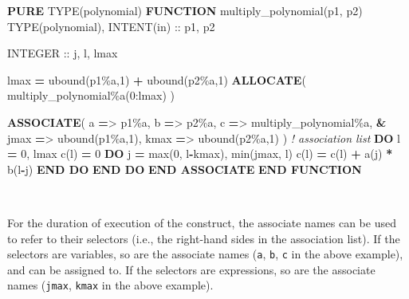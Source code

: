\documentclass[
]{scrartcl}
\newenvironment{Shaded}{}{}
\newcommand{\BuiltInTok}[1]{\textcolor[rgb]{0.00,0.50,0.00}{#1}}
\newcommand{\CommentTok}[1]{\textcolor[rgb]{0.38,0.63,0.69}{\textit{#1}}}
\newcommand{\DataTypeTok}[1]{\textcolor[rgb]{0.56,0.13,0.00}{#1}}
\newcommand{\DecValTok}[1]{\textcolor[rgb]{0.25,0.63,0.44}{#1}}
\newcommand{\FunctionTok}[1]{\textcolor[rgb]{0.02,0.16,0.49}{#1}}
\newcommand{\KeywordTok}[1]{\textcolor[rgb]{0.00,0.44,0.13}{\textbf{#1}}}
\newcommand{\NormalTok}[1]{#1}
\newcommand{\OperatorTok}[1]{\textcolor[rgb]{0.40,0.40,0.40}{#1}}
\begin{document}
\begin{Shaded}
\begin{Highlighting}[]
\KeywordTok{PURE} \DataTypeTok{TYPE(polynomial)} \KeywordTok{FUNCTION}\NormalTok{ multiply\_polynomial(p1, p2)}
   \DataTypeTok{TYPE(polynomial)}\NormalTok{, }\DataTypeTok{INTENT(in)} \DataTypeTok{::}\NormalTok{ p1, p2}

   \DataTypeTok{INTEGER} \DataTypeTok{::}\NormalTok{ j, l, lmax}

\NormalTok{   lmax }\KeywordTok{=} \FunctionTok{ubound}\NormalTok{(p1}\OperatorTok{\%}\NormalTok{a,}\DecValTok{1}\NormalTok{) }\KeywordTok{+} \FunctionTok{ubound}\NormalTok{(p2}\OperatorTok{\%}\NormalTok{a,}\DecValTok{1}\NormalTok{)}
   \KeywordTok{ALLOCATE}\NormalTok{( multiply\_polynomial}\OperatorTok{\%}\NormalTok{a(}\DecValTok{0}\NormalTok{:lmax) )}

   \KeywordTok{ASSOCIATE}\NormalTok{( a }\KeywordTok{=}\OperatorTok{\textgreater{}}\NormalTok{ p1}\OperatorTok{\%}\NormalTok{a, b }\KeywordTok{=}\OperatorTok{\textgreater{}}\NormalTok{ p2}\OperatorTok{\%}\NormalTok{a, c }\KeywordTok{=}\OperatorTok{\textgreater{}}\NormalTok{ multiply\_polynomial}\OperatorTok{\%}\NormalTok{a, }\KeywordTok{\&}
\NormalTok{              jmax }\KeywordTok{=}\OperatorTok{\textgreater{}} \FunctionTok{ubound}\NormalTok{(p1}\OperatorTok{\%}\NormalTok{a,}\DecValTok{1}\NormalTok{), kmax }\KeywordTok{=}\OperatorTok{\textgreater{}} \FunctionTok{ubound}\NormalTok{(p2}\OperatorTok{\%}\NormalTok{a,}\DecValTok{1}\NormalTok{) )  }\CommentTok{! association list}
      \KeywordTok{DO}\NormalTok{ l }\KeywordTok{=} \DecValTok{0}\NormalTok{, lmax}
\NormalTok{         c(l) }\KeywordTok{=} \DecValTok{0}
         \KeywordTok{DO}\NormalTok{ j }\KeywordTok{=} \BuiltInTok{max}\NormalTok{(}\DecValTok{0}\NormalTok{, l}\KeywordTok{{-}}\NormalTok{kmax), }\BuiltInTok{min}\NormalTok{(jmax, l)}
\NormalTok{            c(l) }\KeywordTok{=}\NormalTok{ c(l) }\KeywordTok{+}\NormalTok{ a(j) }\KeywordTok{*}\NormalTok{ b(l}\KeywordTok{{-}}\NormalTok{j)}
         \KeywordTok{END DO}
      \KeywordTok{END DO}
   \KeywordTok{END ASSOCIATE}
\KeywordTok{END FUNCTION}
\end{Highlighting}
\end{Shaded}

~ ~ ~ ~ ~ ~ ~

For the duration of execution of the construct, the associate names can
be used to refer to their selectors (i.e., the right-hand sides in the
association list). If the selectors are variables, so are the associate
names (\texttt{a}, \texttt{b}, \texttt{c} in the above example), and can
be assigned to. If the selectors are expressions, so are the associate
names (\texttt{jmax}, \texttt{kmax} in the above example).
\end{document}
